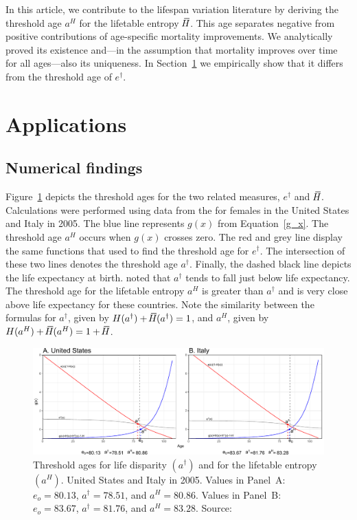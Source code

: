 \documentclass[a4paper,twoside, openright, 12pt, leqno]{article}
\newcommand*\xbar[1]{%
   \hbox{%
     \vbox{%
       \hrule height 0.5pt %
       \kern0.3ex%
       \hbox{%
         \kern-0.28em%
         \ensuremath{#1}%
         \kern-0.05em%
       }%
     }%
   }%
}
\begin{document}
In this article, we contribute to the lifespan variation literature by deriving the threshold age $a^H$ for the lifetable entropy $\,\xbar{H}$. This age separates negative from positive contributions of age-specific mortality improvements. We analytically proved its existence and---in the assumption that mortality improves over time for all ages---also its uniqueness. In Section~\ref{sec:application} we empirically show that it differs from the threshold age of $e^\dagger$.


\section{Applications}
\label{sec:application}

\subsection{Numerical findings}

Figure~\ref{fig:Fig1} depicts the threshold ages for the two related measures, $e^\dagger$ and $\,\xbar{H}$. Calculations were performed using data from the \citet{HMD} for females in the United States and Italy in 2005. The blue line represents $g(x)$ from Equation~\eqref{g_x}. The threshold age $a^H$ occurs when  $g(x)$ crosses zero. The red and grey line display the same functions that \cite{Zhang2009} used to find the threshold age for $e^\dagger$. The intersection of these two lines denotes the threshold age $a^\dagger$. Finally, the dashed black line depicts the life expectancy at birth. \citet{Vaupel2011} noted that $a^\dagger$ tends to fall just below life expectancy. The threshold age for the lifetable entropy $a^H$ is greater than $a^\dagger$ and is very close above life expectancy for these countries. Note the similarity between the formulas for $a^\dagger$, given by $H(a^\dagger)+\,\xbar{H}(a^\dagger)=1$, and $a^H$, given by $H(a^H)+\,\xbar{H}(a^H)= 1+\,\xbar{H}$.

\begin{figure}[h]
  \centering
  \includegraphics[scale=.72]{Figures/Ages2005}
  \caption{Threshold ages for life disparity $(a^\dagger)$ and for the lifetable entropy $(a^H)$. United States and Italy in 2005. Values in Panel~A: $e_o=80.13$, $a^\dagger=78.51$, and $a^H=80.86$. Values in Panel~B: $e_o=83.67$, $a^\dagger=81.76$, and $a^H=83.28$. Source: \cite{HMD}}
  \label{fig:Fig1}
\end{figure}
\end{document}
